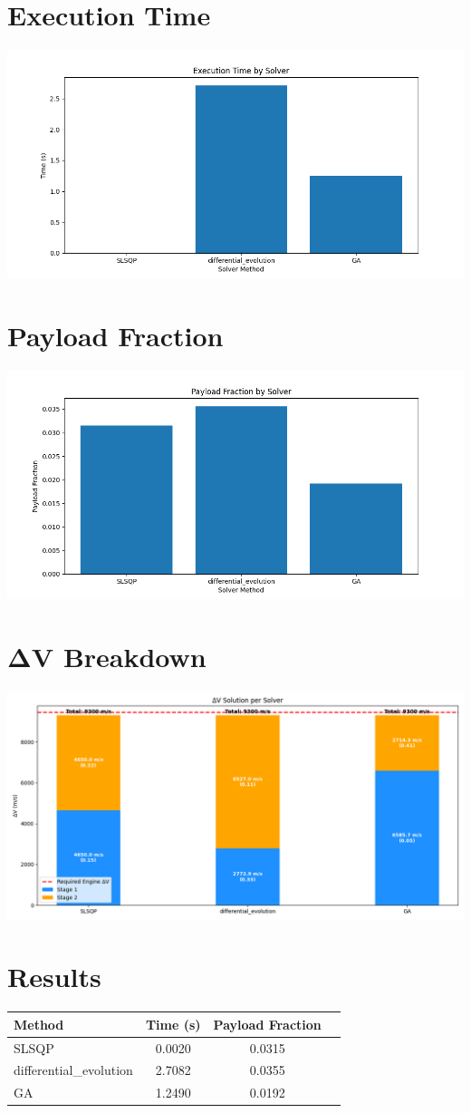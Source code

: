 \documentclass{article}
\begin{document}
\section{Execution Time}
\includegraphics[width=\textwidth]{execution_time.png}

\section{Payload Fraction}
\includegraphics[width=\textwidth]{payload_fraction.png}
                
\section{ΔV Breakdown}
\includegraphics[width=\textwidth]{dv_breakdown.png}

\section{Results}
\begin{tabular}{lccc}
\hline
Method & Time (s) & Payload Fraction \\
\hline
SLSQP & 0.0020 & 0.0315 \\
differential_evolution & 2.7082 & 0.0355 \\
GA & 1.2490 & 0.0192 \\
\hline
\end{tabular}
\end{document}
